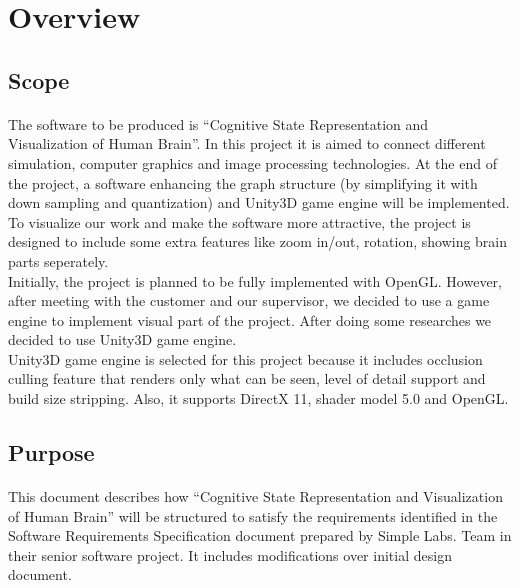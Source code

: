 
\newpage

\section{Overview}
\subsection{Scope}
\paragraph{}
\normalsize
The software to be produced is “Cognitive State Representation and Visualization of Human Brain”. In this project it is aimed to connect different simulation, computer graphics and image processing technologies. At the end of the project, a software enhancing the graph structure (by simplifying it with down sampling and quantization) and Unity3D game engine will be implemented. To visualize our work and make the software more attractive, the project is designed to include some extra features like zoom in/out, rotation, showing brain parts seperately. \\
    
    Initially, the project is planned to be fully implemented with OpenGL. However, after meeting with the customer and our supervisor, we decided to use a game engine to implement visual part of the project. After doing some researches we decided to use Unity3D game engine.\\
    
    Unity3D game engine is selected for this project because it includes occlusion culling feature that renders only what can be seen, level of detail support and build size stripping. Also, it supports DirectX 11, shader model 5.0 and OpenGL.\\
\skipsubsection
    
    
\subsection{Purpose}
\paragraph{}
\normalsize
This document describes how “Cognitive State Representation and Visualization of Human Brain” will be structured to satisfy the requirements identified in the Software Requirements Specification document prepared by Simple Labs. Team in their senior software project. It includes modifications over initial design document.\\
    
